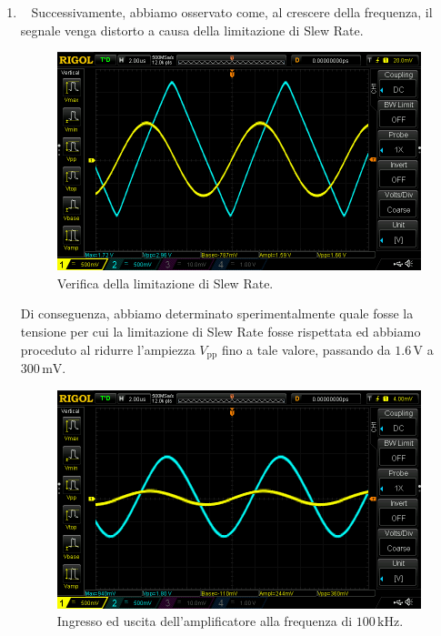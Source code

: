 \documentclass[a4paper]{article}
\begin{document}
			\begin{enumerate}[label=\alph*.]
				\item \ 
					\newline
					Successivamente, abbiamo osservato come, al crescere della frequenza, il segnale venga distorto a causa della limitazione di Slew Rate.
					\begin{figure}[h!]
						\centering
						\includegraphics[scale=0.4]{slewRate}
						\caption{Verifica della limitazione di Slew Rate.}
						\label{fig:slewRate}
					\end{figure}
					\newline
					Di conseguenza, abbiamo determinato sperimentalmente quale fosse la tensione per cui la limitazione di Slew Rate fosse rispettata ed abbiamo proceduto al ridurre l'ampiezza $ V_{\mathrm{pp}} $ fino a tale valore, passando da $ 1.6 \, \mathrm{V} $ a $ 300 \, \mathrm{mV} $.
					\begin{figure}[h!]
						\centering
						\includegraphics[scale=0.4]{segnaleCorrettoSlewRate}
						\caption{Ingresso ed uscita dell'amplificatore alla frequenza di $ 100 \, \mathrm{kHz} $.}

\end{figure}
\end{enumerate}
\end{document}

